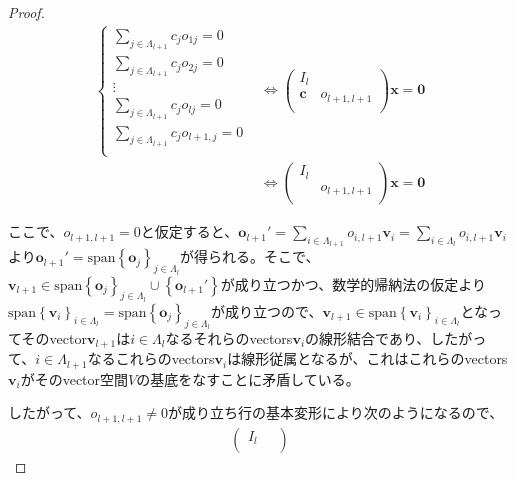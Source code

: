 \documentclass[dvipdfmx]{jsarticle}
\begin{document}
\begin{proof}
\begin{align*}
\left\{ \begin{matrix}
\sum_{j \in \varLambda_{l + 1}} {c_{j}o_{1j}} = 0 \\
\sum_{j \in \varLambda_{l + 1}} {c_{j}o_{2j}} = 0 \\
 \vdots \\
\sum_{j \in \varLambda_{l + 1}} {c_{j}o_{lj}} = 0 \\
\sum_{j \in \varLambda_{l + 1}} {c_{j}o_{l + 1,j}} = 0 \\
\end{matrix} \right. &\Leftrightarrow \begin{pmatrix}
I_{l} & \  \\
\mathbf{c} & o_{l + 1,l + 1} \\
\end{pmatrix}\mathbf{x} = \mathbf{0}\\
&\Leftrightarrow \begin{pmatrix}
I_{l} & \  \\
\mathbf{\ } & o_{l + 1,l + 1} \\
\end{pmatrix}\mathbf{x} = \mathbf{0}
\end{align*}\par
ここで、$o_{l + 1,l + 1} = 0$と仮定すると、$\mathbf{o}_{l + 1}' = \sum_{i \in \varLambda_{l + 1}} {o_{i,l + 1}\mathbf{v}_{i}} = \sum_{i \in \varLambda_{l}} {o_{i,l + 1}\mathbf{v}_{i}}$より$\mathbf{o}_{l + 1}' = \mathrm{span}\left\{ \mathbf{o}_{j} \right\}_{j \in \varLambda_{l}}$が得られる。そこで、$\mathbf{v}_{l + 1} \in \mathrm{span}{\left\{ \mathbf{o}_{j} \right\}_{j \in \varLambda_{l}} \cup \left\{ \mathbf{o}_{l + 1}' \right\}}$が成り立つかつ、数学的帰納法の仮定より$\mathrm{span}\left\{ \mathbf{v}_{i} \right\}_{i \in \varLambda_{l}} = \mathrm{span}\left\{ \mathbf{o}_{j} \right\}_{j \in \varLambda_{l}}$が成り立つので、$\mathbf{v}_{l + 1} \in \mathrm{span}\left\{ \mathbf{v}_{i} \right\}_{i \in \varLambda_{l}}$となってそのvector$\mathbf{v}_{l + 1}$は$i \in \varLambda_{l}$なるそれらのvectors$\mathbf{v}_{i}$の線形結合であり、したがって、$i \in \varLambda_{l + 1}$なるこれらのvectors$\mathbf{v}_{i}$は線形従属となるが、これはこれらのvectors$\mathbf{v}_{i}$がそのvector空間$V$の基底をなすことに矛盾している。\par
したがって、$o_{l + 1,l + 1} \neq 0$が成り立ち行の基本変形により次のようになるので、
\begin{align*}
\begin{pmatrix}
I_{l} & \  \\

\end{pmatrix}
\end{align*}
\end{proof}
\end{document}
